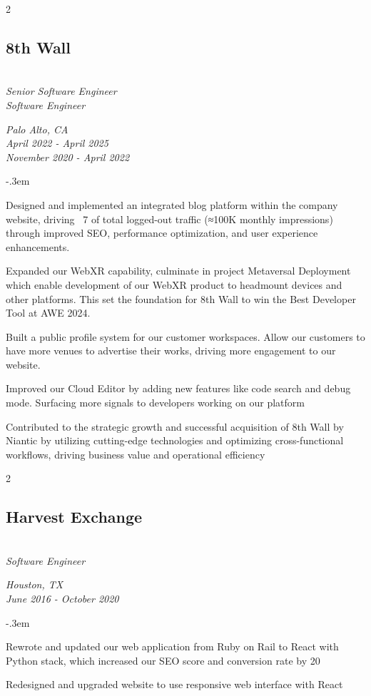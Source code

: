 \documentclass{article}
\let\olditemize=\itemize \let\endolditemize=\enditemize
\renewenvironment{itemize}{\olditemize[topsep=0em] \itemsep-.3em}{\endolditemize}
\newenvironment{twocolentry}[2][]{
    \def\secondColumn{#2}
    \raggedright
    \setcolumnwidth{\fill, 6cm}
    \begin{paracol}{2}
}{
    \switchcolumn \raggedleft \secondColumn
    \end{paracol}
} %
\begin{document}
\begin{twocolentry}{
  \textit{Palo Alto, CA} \\
  \textit{April 2022 - April 2025} \\
  \textit{November 2020 - April 2022}
}
\subsection{8th Wall}\hfill\\
\textit{Senior Software Engineer} \\
\textit{Software Engineer}
\end{twocolentry}
\begin{itemize}
  \item Designed and implemented an integrated blog platform within the company website, driving ~7%
  of total logged-out traffic (≈100K monthly impressions) through improved SEO, performance
  optimization, and user experience enhancements.
  \item Expanded our WebXR capability, culminate in project Metaversal Deployment which enable
  development of our WebXR product to headmount devices and other platforms. This set the foundation
  for 8th Wall to win the Best Developer Tool at AWE 2024.
  \item Built a public profile system for our customer workspaces. Allow our customers to have more
  venues to advertise their works, driving more engagement to our website. 
  \item Improved our Cloud Editor by adding new features like code search and debug mode. Surfacing
  more signals to developers working on our platform
  \item Contributed to the strategic growth and successful acquisition of 8th Wall by Niantic by
  utilizing cutting-edge technologies and optimizing cross-functional workflows, driving business
  value and operational efficiency
\end{itemize}

\begin{twocolentry}{
  \textit{Houston, TX} \\
  \textit{June 2016 - October 2020} \\
}
\subsection{Harvest Exchange}\hfill\\
\textit{Software Engineer}
\end{twocolentry}
\begin{itemize}
  \item Rewrote and updated our web application from Ruby on Rail to React with Python stack, which
  increased our SEO score and conversion rate by 20%
  \item Redesigned and upgraded website to use responsive web interface with React
\end{itemize}
\end{document}
